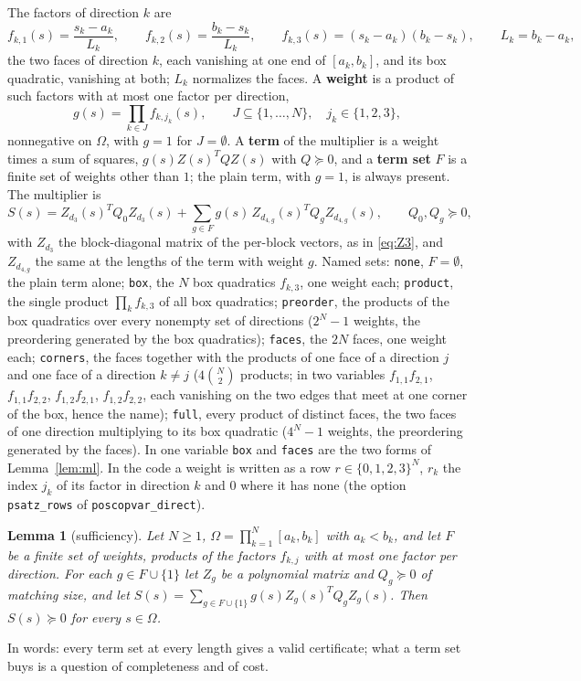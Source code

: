\documentclass[12pt]{article}
\newcommand{\code}[1]{\texttt{#1}}
\theoremstyle{plain}
\newtheorem{lemma}[theorem]{Lemma}
\theoremstyle{definition}
\theoremstyle{remark}
\begin{document}
The factors of direction $k$ are
\[
f_{k,1}(s)=\frac{s_k-a_k}{L_k},\qquad f_{k,2}(s)=\frac{b_k-s_k}{L_k},\qquad f_{k,3}(s)=(s_k-a_k)(b_k-s_k),\qquad L_k=b_k-a_k,
\]
the two faces of direction $k$, each vanishing at one end of $[a_k,b_k]$, and its box quadratic, vanishing at both; $L_k$ normalizes the faces. A \textbf{weight} is a product of such factors with at most one factor per direction,
\[
g(s)=\prod_{k\in J}f_{k,j_k}(s),\qquad J\subseteq\{1,\dots,N\},\quad j_k\in\{1,2,3\},
\]
nonnegative on $\Omega$, with $g=1$ for $J=\emptyset$. A \textbf{term} of the multiplier is a weight times a sum of squares, $g(s)Z(s)^TQZ(s)$ with $Q\succeq0$, and a \textbf{term set} $F$ is a finite set of weights other than $1$; the plain term, with $g=1$, is always present. The multiplier is
\begin{equation}\label{eq:SN}
S(s)=Z_{d_3}(s)^TQ_0Z_{d_3}(s)+\sum_{g\in F}g(s)\,Z_{d_{4,g}}(s)^TQ_gZ_{d_{4,g}}(s),\qquad Q_0,Q_g\succeq0,
\end{equation}
with $Z_{d_3}$ the block-diagonal matrix of the per-block vectors, as in \eqref{eq:Z3}, and $Z_{d_{4,g}}$ the same at the lengths of the term with weight $g$. Named sets: \code{none}, $F=\emptyset$, the plain term alone; \code{box}, the $N$ box quadratics $f_{k,3}$, one weight each; \code{product}, the single product $\prod_kf_{k,3}$ of all box quadratics; \code{preorder}, the products of the box quadratics over every nonempty set of directions ($2^N-1$ weights, the preordering generated by the box quadratics); \code{faces}, the $2N$ faces, one weight each; \code{corners}, the faces together with the products of one face of a direction $j$ and one face of a direction $k\ne j$ ($4\binom N2$ products; in two variables $f_{1,1}f_{2,1}$, $f_{1,1}f_{2,2}$, $f_{1,2}f_{2,1}$, $f_{1,2}f_{2,2}$, each vanishing on the two edges that meet at one corner of the box, hence the name); \code{full}, every product of distinct faces, the two faces of one direction multiplying to its box quadratic ($4^N-1$ weights, the preordering generated by the faces). In one variable \code{box} and \code{faces} are the two forms of Lemma~\ref{lem:ml}. In the code a weight is written as a row $r\in\{0,1,2,3\}^N$, $r_k$ the index $j_k$ of its factor in direction $k$ and $0$ where it has none (the option \code{psatz\_rows} of \code{poscopvar\_direct}).

\begin{lemma}[sufficiency]\label{lem:suff}
Let $N\ge1$, $\Omega=\prod_{k=1}^N[a_k,b_k]$ with $a_k<b_k$, and let $F$ be a finite set of weights, products of the factors $f_{k,j}$ with at most one factor per direction. For each $g\in F\cup\{1\}$ let $Z_g$ be a polynomial matrix and $Q_g\succeq0$ of matching size, and let $S(s)=\sum_{g\in F\cup\{1\}}g(s)Z_g(s)^TQ_gZ_g(s)$. Then $S(s)\succeq0$ for every $s\in\Omega$.
\end{lemma}
In words: every term set at every length gives a valid certificate; what a term set buys is a question of completeness and of cost.
\end{document}
